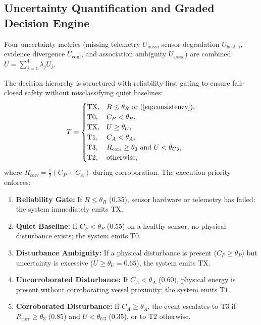 \documentclass[conference]{IEEEtran}
\newcommand{\dstate}[1]{\ensuremath{\mathrm{#1}}}
\begin{document}
\subsection{Uncertainty Quantification and Graded Decision Engine}
\label{sec:decision-engine}

Four uncertainty metrics (missing telemetry $U_{\mathrm{miss}}$, sensor degradation
$U_{\mathrm{health}}$, evidence divergence $U_{\mathrm{conf}}$, and association
ambiguity $U_{\mathrm{assoc}}$) are combined: $U = \sum_{j=1}^4 \lambda_j U_j$.

The decision hierarchy is structured with reliability-first gating to ensure
fail-closed safety without misclassifying quiet baselines:
\begin{equation}
T =
\begin{cases}
\dstate{TX}, & R \leq \theta_R \ \text{or}\ \text{(\ref{eq:consistency})}, \\
\dstate{T0}, & C_P < \theta_P, \\
\dstate{TX}, & U \geq \theta_U, \\
\dstate{T1}, & C_A < \theta_A, \\
\dstate{T3}, & R_{\mathrm{corr}} \geq \theta_3 \ \text{and}\ U < \theta_{U3}, \\
\dstate{T2}, & \text{otherwise},
\end{cases}
\label{eq:decision}
\end{equation}
where $R_{\mathrm{corr}} = \frac{1}{2}(C_P + C_A)$ during corroboration.
The execution priority enforces:
\begin{enumerate}
\item \textbf{Reliability Gate:} If $R \leq \theta_R$ (0.35), sensor hardware or
telemetry has failed; the system immediately emits \dstate{TX}.
\item \textbf{Quiet Baseline:} If $C_P < \theta_P$ (0.55) on a healthy sensor,
no physical disturbance exists; the system emits \dstate{T0}.
\item \textbf{Disturbance Ambiguity:} If a physical disturbance is present
($C_P \geq \theta_P$) but uncertainty is excessive ($U \geq \theta_U = 0.65$),
the system emits \dstate{TX}.
\item \textbf{Uncorroborated Disturbance:} If $C_A < \theta_A$ (0.60), physical
energy is present without corroborating vessel proximity; the system emits \dstate{T1}.
\item \textbf{Corroborated Disturbance:} If $C_A \geq \theta_A$, the event
escalates to \dstate{T3} if $R_{\mathrm{corr}} \geq \theta_3$ (0.85) and
$U < \theta_{U3}$ (0.35), or to \dstate{T2} otherwise.
\end{enumerate}
\end{document}
